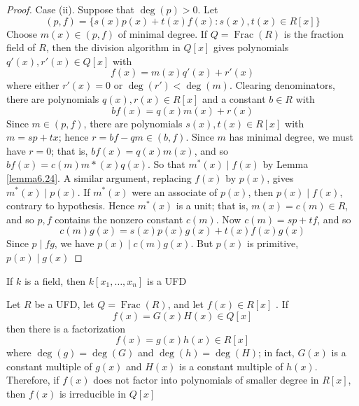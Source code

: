 \documentclass[11pt]{article}
\DeclareMathOperator{\Frac}{Frac}
\begin{document}
\begin{proof}
Case (ii). Suppose that \(\deg(p)>0\). Let 
\begin{equation*}
(p,f)=\{s(x)p(x)+t(x)f(x):s(x),t(x)\in R[x]\}
\end{equation*}
Choose \(m(x)\in(p,f)\) of minimal degree. If \(Q=\Frac(R)\) is the fraction
field of \(R\), then the division algorithm in \(Q[x]\) gives polynomials
\(q'(x),r'(x)\in Q[x]\) with
\begin{equation*}
f(x)=m(x)q'(x)+r'(x)
\end{equation*}
where either \(r'(x)=0\) or \(\deg(r')<\deg(m)\). Clearing denominators,
there are polynomials \(q(x),r(x)\in R[x]\) and a constant \(b\in R\) with
\begin{equation*}
bf(x)=q(x)m(x)+r(x)
\end{equation*}
Since \(m\in(p,f)\), there are polynomials \(s(x),t(x)\in R[x]\) with 
\(m=sp+tx\); hence \(r=bf-qm\in(b,f)\). Since \(m\) has minimal degree, we
must have \(r=0\); that is, \(bf(x)=q(x)m(x)\), and so
\(bf(x)=c(m)m*(x)q(x)\). So that \(m^*(x)\mid f(x)\) by Lemma \ref{lemma6.24}.
A similar argument, replacing \(f(x)\) by \(p(x)\), gives 
\(m^*(x)\mid p(x)\). If \(m^*(x)\) were an associate of \(p(x)\), then
\(p(x)\mid f(x)\), contrary to hypothesis. Hence \(m^*(x)\) is a unit; that
is, \(m(x)=c(m)\in R\), and so \(p,f\) contains the nonzero constant
\(c(m)\). Now \(c(m)=sp+tf\), and so
\begin{equation*}
c(m)g(x)=s(x)p(x)g(x)+t(x)f(x)g(x)
\end{equation*}
Since \(p\mid fg\), we have \(p(x)\mid c(m)g(x)\). But \(p(x)\) is primitive, 
\(p(x)\mid g(x)\)
\end{proof}

\begin{corollary}[]
If \(k\) is a field, then \(k[x_1,\dots,x_n]\) is a UFD
\end{corollary}

\begin{corollary}[Gauss]
\label{ncor5.28}
Let \(R\) be a UFD, let \(Q=\Frac(R)\), and let \(f(x)\in R[x]\) . If 
\begin{equation*}
f(x)=G(x)H(x)\in Q[x]
\end{equation*}
then there is a factorization
\begin{equation*}
f(x)=g(x)h(x)\in R[x]
\end{equation*}
where \(\deg(g)=\deg(G)\) and \(\deg(h)=\deg(H)\); in fact, \(G(x)\) is a
constant multiple of \(g(x)\) and \(H(x)\) is a constant multiple of
\(h(x)\). Therefore, if \(f(x)\) does not factor into polynomials of smaller
degree in \(R[x]\), then \(f(x)\) is irreducible in \(Q[x]\)
\end{corollary}
\end{document}
